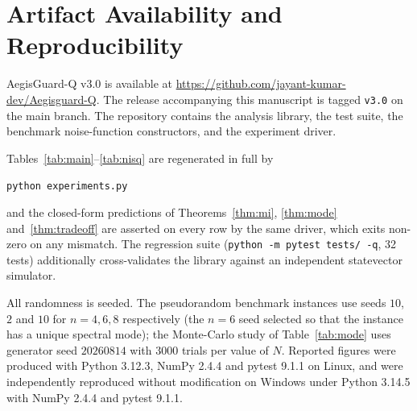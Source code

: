 \documentclass[10pt,twocolumn]{article}
\theoremstyle{definition}
\begin{document}
\section*{Artifact Availability and Reproducibility}

AegisGuard-Q v3.0 is available at
\url{https://github.com/jayant-kumar-dev/Aegisguard-Q}. The release
accompanying this manuscript is tagged \texttt{v3.0} on the main branch. The repository contains
the analysis library, the test suite, the benchmark noise-function
constructors, and the experiment driver.

Tables~\ref{tab:main}--\ref{tab:nisq} are regenerated in full by

\begin{center}\texttt{python experiments.py}\end{center}

\noindent and the closed-form predictions of Theorems~\ref{thm:mi},
\ref{thm:mode} and~\ref{thm:tradeoff} are asserted on every row by the same
driver, which exits non-zero on any mismatch. The regression suite
(\texttt{python -m pytest tests/ -q}, 32 tests) additionally cross-validates the
library against an independent statevector simulator.

All randomness is seeded. The pseudorandom benchmark instances use seeds
$10$, $2$ and $10$ for $n = 4, 6, 8$ respectively (the $n=6$ seed selected so
that the instance has a unique spectral mode); the Monte-Carlo study of
Table~\ref{tab:mode} uses generator seed $20260814$ with $3000$ trials per
value of $N$. Reported figures were produced with Python 3.12.3, NumPy 2.4.4
and pytest 9.1.1 on Linux, and were independently reproduced without
modification on Windows under Python 3.14.5 with NumPy 2.4.4 and
pytest 9.1.1.
\end{document}
